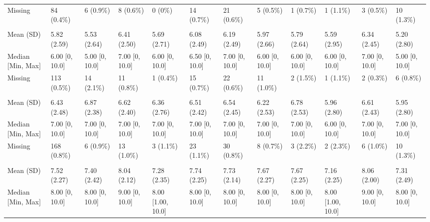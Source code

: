 \documentclass[
  single column]{article}
\begin{document}
\begin{landscape}
\begin{longtable}[t]{llllllllllll}
\hspace{1em}Missing & 84 (0.4\%) & 6 (0.9\%) & 8 (0.6\%) & 0 (0\%) & 14 (0.7\%) & 21 (0.6\%) & 5 (0.5\%) & 1 (0.7\%) & 1 (1.1\%) & 3 (0.5\%) & 10 (1.3\%)\\
\addlinespace[0.3em]
\multicolumn{12}{l}{\textbf{PWB Your Future Security}}\\
\hspace{1em}Mean (SD) & 5.82 (2.59) & 5.53 (2.64) & 6.41 (2.50) & 5.69 (2.71) & 6.08 (2.49) & 6.19 (2.49) & 5.97 (2.66) & 5.79 (2.64) & 5.59 (2.95) & 6.34 (2.45) & 5.20 (2.80)\\
\hspace{1em}Median [Min, Max] & 6.00 [0, 10.0] & 5.00 [0, 10.0] & 7.00 [0, 10.0] & 6.00 [0, 10.0] & 6.50 [0, 10.0] & 7.00 [0, 10.0] & 6.00 [0, 10.0] & 6.00 [0, 10.0] & 6.00 [0, 10.0] & 7.00 [0, 10.0] & 5.00 [0, 10.0]\\
\hspace{1em}Missing & 113 (0.5\%) & 14 (2.1\%) & 11 (0.8\%) & 1 (0.4\%) & 15 (0.7\%) & 22 (0.6\%) & 11 (1.0\%) & 2 (1.5\%) & 1 (1.1\%) & 2 (0.3\%) & 6 (0.8\%)\\
\addlinespace[0.3em]
\multicolumn{12}{l}{\textbf{PWB Your Health}}\\
\hspace{1em}Mean (SD) & 6.43 (2.48) & 6.87 (2.38) & 6.62 (2.40) & 6.36 (2.76) & 6.51 (2.42) & 6.54 (2.45) & 6.22 (2.53) & 6.78 (2.53) & 5.96 (2.80) & 6.61 (2.43) & 5.95 (2.80)\\
\hspace{1em}Median [Min, Max] & 7.00 [0, 10.0] & 7.00 [0, 10.0] & 7.00 [0, 10.0] & 7.00 [0, 10.0] & 7.00 [0, 10.0] & 7.00 [0, 10.0] & 7.00 [0, 10.0] & 7.00 [0, 10.0] & 6.00 [0, 10.0] & 7.00 [0, 10.0] & 7.00 [0, 10.0]\\
\hspace{1em}Missing & 168 (0.8\%) & 6 (0.9\%) & 13 (1.0\%) & 3 (1.1\%) & 23 (1.1\%) & 30 (0.8\%) & 8 (0.7\%) & 3 (2.2\%) & 2 (2.3\%) & 6 (1.0\%) & 10 (1.3\%)\\
\addlinespace[0.3em]
\multicolumn{12}{l}{\textbf{PWB Your Relationships}}\\
\hspace{1em}Mean (SD) & 7.52 (2.27) & 7.40 (2.42) & 8.04 (2.12) & 7.28 (2.35) & 7.74 (2.25) & 7.73 (2.14) & 7.67 (2.27) & 7.67 (2.25) & 7.16 (2.25) & 8.06 (2.00) & 7.31 (2.49)\\
\hspace{1em}Median [Min, Max] & 8.00 [0, 10.0] & 8.00 [0, 10.0] & 9.00 [0, 10.0] & 8.00 [1.00, 10.0] & 8.00 [0, 10.0] & 8.00 [0, 10.0] & 8.00 [0, 10.0] & 8.00 [0, 10.0] & 8.00 [1.00, 10.0] & 9.00 [0, 10.0] & 8.00 [0, 10.0]\\

\end{longtable}
\end{landscape}
\end{document}
